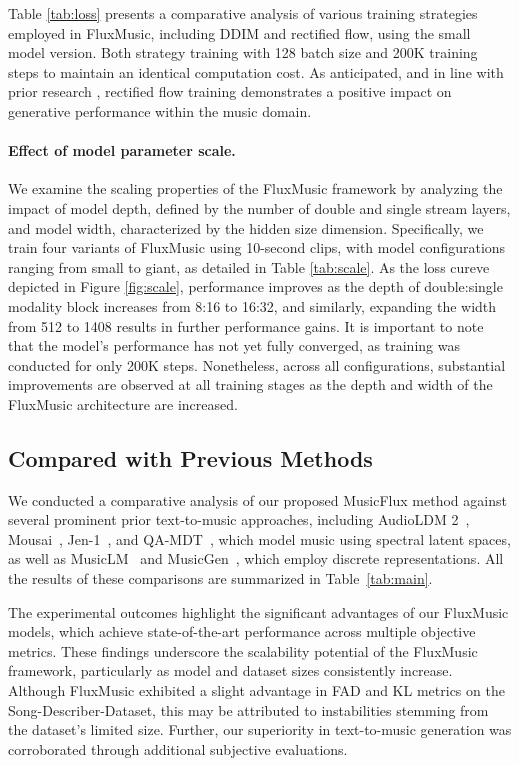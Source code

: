 Table \ref{tab:loss} presents a comparative analysis of various training strategies employed in FluxMusic, including DDIM and rectified flow, using the small model version. Both strategy training with 128 batch size and 200K training steps to maintain an identical computation cost. As anticipated, and in line with prior research \cite{esser2024scaling}, rectified flow training demonstrates a positive impact on generative performance within the music domain.

\paragraph{Effect of model parameter scale.}

We examine the scaling properties of the FluxMusic framework by analyzing the impact of model depth, defined by the number of double and single stream layers, and model width, characterized by the hidden size dimension. Specifically, we train four variants of FluxMusic using 10-second clips, with model configurations ranging from small to giant, as detailed in Table \ref{tab:scale}.
As the loss cureve depicted in Figure \ref{fig:scale}, performance improves as the depth of double:single modality block increases from 8:16 to 16:32, and similarly, expanding the width from 512 to 1408 results in further performance gains. It is important to note that the model's performance has not yet fully converged, as training was conducted for only 200K steps. Nonetheless, across all configurations, substantial improvements are observed at all training stages as the depth and width of the FluxMusic architecture are increased.

\subsection{Compared with Previous Methods}
We conducted a comparative analysis of our proposed MusicFlux method against several prominent prior text-to-music approaches, including AudioLDM 2~\citep{liu2024audioldm}, Mousai~\citep{schneider2024mousai}, Jen-1~\citep{li2024jen}, and QA-MDT~\cite{li2024quality}, which model music using spectral latent spaces, as well as MusicLM~\citep{agostinelli2023musiclm} and MusicGen~\cite{copet2024simple}, which employ discrete representations. All the results of these comparisons are summarized in Table~\ref{tab:main}.

The experimental outcomes highlight the significant advantages of our FluxMusic models, which achieve state-of-the-art performance across multiple objective metrics. These findings underscore the scalability potential of the FluxMusic framework, particularly as model and dataset sizes consistently increase.
Although FluxMusic exhibited a slight advantage in FAD and KL metrics on the Song-Describer-Dataset, this may be attributed to instabilities stemming from the dataset's limited size. Further, our superiority in text-to-music generation was corroborated through additional subjective evaluations.

